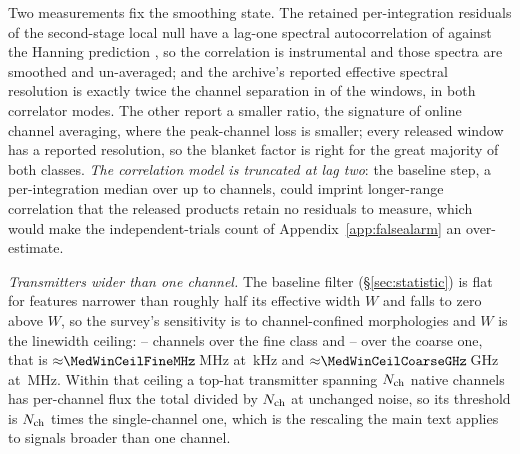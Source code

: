 Two measurements fix the smoothing state. The retained per-integration
residuals of the second-stage local null have a lag-one spectral
autocorrelation of \LNLagOne{} against the Hanning prediction \HanRhoOne, so
the correlation is instrumental and those spectra are smoothed and
un-averaged; and the archive's reported effective spectral resolution is
exactly twice the channel separation in \NHanTwo{} of the \NHanKnown{}
windows, in both correlator modes. The other \NHanOther{} report a smaller
ratio, the signature of online channel averaging, where the peak-channel loss
is smaller; every released window has a reported resolution, so the blanket
factor is right for the great majority of both classes. \emph{The correlation model is truncated at
lag two}: the baseline step, a per-integration median over up to \MedWin{}
channels, could imprint longer-range correlation that the released products
retain no residuals to measure, which would make the independent-trials count
of Appendix~\ref{app:falsealarm} an over-estimate.

\emph{Transmitters wider than one channel.} The baseline filter
(\S\ref{sec:statistic}) is flat for features narrower than roughly half its
effective width $W$ and falls to zero above $W$, so the survey's sensitivity
is to channel-confined morphologies and $W$ is the linewidth ceiling:
\MedWinFineLo--\MedWinFineHi{} channels over the fine class and
\MedWinCoarseLo--\MedWinCoarseHi{} over the coarse one, that is
${\approx}\MedWinCeilFineMHz$\,MHz at \ChanFineKHz\,kHz and
${\approx}\MedWinCeilCoarseGHz$\,GHz at \ChanCoarseMHz\,MHz. Within that
ceiling a top-hat transmitter spanning $N_{\rm ch}$ native channels has
per-channel flux the total divided by $N_{\rm ch}$ at unchanged noise, so
its threshold is $N_{\rm ch}$ times the single-channel one, which is the
rescaling the main text applies to signals broader than one channel.


